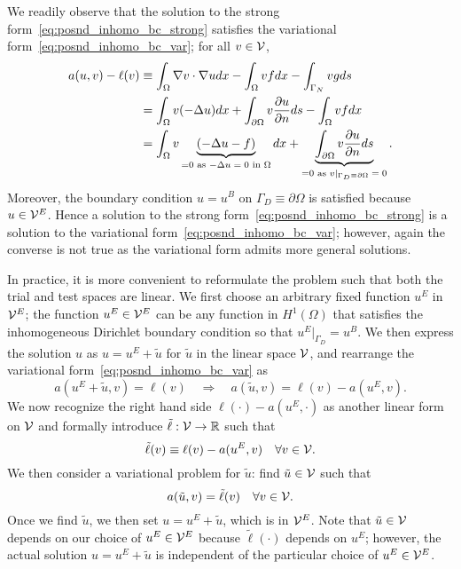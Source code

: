 We readily observe that the solution to the strong form~\eqref{eq:posnd_inhomo_bc_strong} satisfies the variational form~\eqref{eq:posnd_inhomo_bc_var};  for all $v \in \mathcal{V}$,
\begin{align*}
  a(u,v) - \ell(v)
  &\equiv \int_\Omega \nabla v \cdot \nabla u dx - \int_\Omega vf dx - \int_{\Gamma_N} vg ds
  \\
  &= \int_\Omega v (-\Delta u) dx + \int_{\partial \Omega} v \frac{\partial u}{\partial n} ds  - \int_\Omega vf dx 
  \\
  &= \int_\Omega v \underbrace{ (-\Delta u - f) }_{= 0 \text{ as $-\Delta u=  0$ in $\Omega$}} dx
  + \underbrace{ \int_{\partial \Omega} v \frac{\partial u}{\partial n} ds }_{= 0 \text{ as $v|_{\Gamma_D \equiv \partial \Omega} = 0$}}.
\end{align*}
Moreover, the boundary condition $u = u^B$ on $\Gamma_D \equiv \partial \Omega$ is satisfied because $u \in \mathcal{V}^E$. 
Hence a solution to the strong form~\eqref{eq:posnd_inhomo_bc_strong} is a solution to the variational form~\eqref{eq:posnd_inhomo_bc_var}; however, again the converse is not true as the variational form admits more general solutions.

In practice, it is more convenient to reformulate the problem such that both the trial and test spaces are linear.  We first choose an arbitrary fixed function $u^E$ in $\mathcal{V}^E$; the function $u^E \in \mathcal{V}^E$ can be any function in $H^1(\Omega)$ that satisfies the inhomogeneous Dirichlet boundary condition so that $u^E|_{\Gamma_D} = u^B$. We then express the solution $u$ as $u = u^E + \tilde u$ for $\tilde u$ in the linear space $\mathcal{V}$, and rearrange the variational form~\eqref{eq:posnd_inhomo_bc_var} as
\begin{equation*}
  a(u^E + \tilde u,v) = \ell(v) \quad \Rightarrow \quad
  a(\tilde u,v) = \ell(v) - a(u^E,v).
\end{equation*}
We now recognize the right hand side $\ell(\cdot) - a(u^E,\cdot)$ as another linear form on $\mathcal{V}$ and formally introduce $\tilde \ell: \mathcal{V} \to \mathbb{R}$ such that
\begin{equation*}
  \tilde \ell(v) \equiv \ell(v) - a(u^E,v) \quad \forall v \in \mathcal{V}.
\end{equation*}
We then consider a variational problem for $\tilde u$: find $\tilde u \in \mathcal{V}$ such that
\begin{equation}
  \label{eq:posnd_inhomo_bc_var_reform}
  a(\tilde u,v) = \tilde \ell(v) \quad \forall v \in \mathcal{V}.
\end{equation}
Once we find $\tilde u$, we then set $u = u^E + \tilde u$, which is in $\mathcal{V}^E$. Note that $\tilde u \in \mathcal{V}$ depends on our choice of $u^E \in \mathcal{V}^E$ because $\tilde \ell(\cdot)$ depends on $u^E$; however, the actual solution $u = u^E + \tilde u$ is independent of the particular choice of $u^E \in \mathcal{V}^E$.

